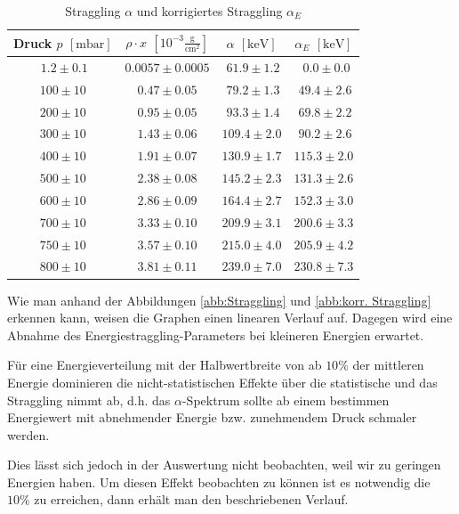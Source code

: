 \documentclass[12pt,a4paper]{scrartcl}
\numberwithin{equation}{section} %
\begin{document}
\begin{table}
	\centering
	\begin{tabular}[h]{c|c|c|c}
		Druck $p$ $[\mathrm{mbar}]$
			& $\rho \cdot x$ $\left[10^{-3} \mathrm{\frac{g}{cm^2}}\right]$
			& $\alpha$ $[\mathrm{keV}]$ & $\alpha _E$ $[\mathrm{keV}]$\\
		\hline
		$\ 1.2 \pm 0.1$ & $0.0057 \pm 0.0005$ & $\ 61.9 \pm 1.2$ & $\ \ 0.0 \pm 0.0$\\
		$100 \pm 10$ & $0.47 \pm 0.05$ & $\ 79.2 \pm 1.3$ & $\ 49.4 \pm 2.6$  \\
		$200 \pm 10$ & $0.95 \pm 0.05$ & $\ 93.3 \pm 1.4$ & $\ 69.8 \pm 2.2 $ \\
		$300 \pm 10$ & $1.43 \pm 0.06$ & $109.4 \pm 2.0$ & $\ 90.2 \pm 2.6$\\
		$400 \pm 10$ & $1.91 \pm 0.07$ & $130.9 \pm 1.7$ & $115.3 \pm 2.0$ \\
		$500 \pm 10$ & $2.38 \pm 0.08$ & $145.2 \pm 2.3$ & $131.3 \pm 2.6$\\
		$600 \pm 10$ & $2.86 \pm 0.09$ & $164.4 \pm 2.7$ & $152.3 \pm 3.0$ \\
		$700 \pm 10$ & $3.33 \pm 0.10$ & $209.9 \pm 3.1$ & $200.6 \pm 3.3$ \\
		$750 \pm 10$ & $3.57 \pm 0.10$ & $215.0 \pm 4.0$ & $205.9 \pm 4.2$\\
		$800 \pm 10$ & $3.81 \pm 0.11$ & $239.0 \pm 7.0$ & $230.8 \pm 7.3$\\
	\end{tabular}
	\caption{Straggling $\alpha$ und korrigiertes Straggling $\alpha_E$}
	\label{tabelle:korr. Straggling}
\end{table}

Wie man anhand der Abbildungen \ref{abb:Straggling} und \ref{abb:korr. Straggling}  erkennen kann, weisen die Graphen einen linearen Verlauf auf. Dagegen wird eine Abnahme des Energiestraggling-Parameters bei kleineren Energien erwartet. \cite{Prior}

Für eine Energieverteilung mit der Halbwertbreite von ab $10\%$ der mittleren Energie dominieren die nicht-statistischen Effekte über die statistische und das Straggling nimmt ab, d.h. das $\alpha$-Spektrum sollte ab einem bestimmen Energiewert mit abnehmender Energie bzw. zunehmendem Druck schmaler werden.

Dies lässt sich jedoch in der Auswertung nicht beobachten, weil wir zu geringen Energien haben. Um diesen Effekt beobachten zu können ist es notwendig die $10\%$ zu erreichen, dann erhält man den beschriebenen Verlauf.
\end{document}
